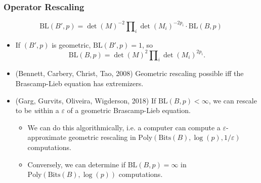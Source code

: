 \documentclass[usenames,dvipsnames,12pt]{beamer}
\begin{document}
\begin{frame}
    \frametitle{Operator Rescaling}

    \[ \text{BL}(B',p) = \det(M)^{-2} \prod\nolimits_i \det(M_i)^{-2p_i} \cdot \text{BL}(B,p) \]

    \begin{itemize}
        \pause
        \item If $(B',p)$ is geometric, $\text{BL}(B',p) = 1$, so
        \[ \text{BL}(B,p) = \det(M)^2 \prod\nolimits_i \det(M_i)^{2p_i}. \]

        \pause
        \item (Bennett, Carbery, Christ, Tao, 2008) Geometric rescaling possible iff the Brascamp-Lieb equation has extremizers.

        \pause
        \item (Garg, Gurvits, Oliveira, Wigderson, 2018) If $\text{BL}(B,p) < \infty$, we can rescale to be {\emph within a $\varepsilon$} of a geometric Brascamp-Lieb equation.
        \begin{itemize}
            \pause
            \item We can do this algorithmically, i.e. a computer can compute a $\varepsilon$-approximate geometric rescaling in $\text{Poly}(\text{Bits}(B),\log(p),1/\varepsilon)$ computations. 

            \pause
            \item
            Conversely, we can determine if $\text{BL}(B,p) = \infty$ in $\text{Poly}(\text{Bits}(B),\log(p))$ computations.
        \end{itemize}
    \end{itemize}
\end{frame}





\end{document}
